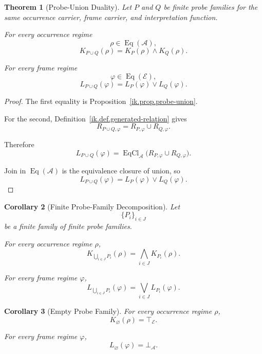 \documentclass[11pt]{article}
\theoremstyle{plain}
\newtheorem{theorem}{Theorem}[section]
\newtheorem{corollary}[theorem]{Corollary}
\theoremstyle{definition}
\theoremstyle{remark}
\begin{document}
\begin{theorem}[Probe-Union Duality]
  \label{ik.thm.probe-union-duality}
  Let \(P\) and \(Q\)
  be finite probe families
  for the same occurrence carrier,
  frame carrier,
  and interpretation function.

  For every occurrence regime
  \[
    \rho
    \in
    \operatorname{Eq}(\mathcal{A}),
  \]
  \[
    K_{P\cup Q}(\rho)
    =
    K_P(\rho)
    \wedge
    K_Q(\rho).
  \]

  For every frame regime
  \[
    \varphi
    \in
    \operatorname{Eq}(\mathcal{E}),
  \]
  \[
    L_{P\cup Q}(\varphi)
    =
    L_P(\varphi)
    \vee
    L_Q(\varphi).
  \]
\end{theorem}

\begin{proof}
  The first equality is
  Proposition~\ref{ik.prop.probe-union}.

  For the second,
  Definition~\ref{ik.def.generated-relation}
  gives
  \[
    R_{P\cup Q,\varphi}
    =
    R_{P,\varphi}
    \cup
    R_{Q,\varphi}.
  \]

  Therefore
  \[
    L_{P\cup Q}(\varphi)
    =
    \operatorname{EqCl}_{\mathcal{A}}
    \bigl(
    R_{P,\varphi}
    \cup
    R_{Q,\varphi}
    \bigr).
  \]

  Join in
  \(\operatorname{Eq}(\mathcal{A})\)
  is the equivalence closure of union,
  so
  \[
    L_{P\cup Q}(\varphi)
    =
    L_P(\varphi)
    \vee
    L_Q(\varphi).
  \]
\end{proof}

\begin{corollary}[Finite Probe-Family Decomposition]
  \label{ik.cor.probe-decomposition}
  Let
  \[
    \{
    P_i
    \}_{i\in J}
  \]
  be a finite family of finite probe families.

  For every occurrence regime \(\rho\),
  \[
    K_{\bigcup_{i\in J}P_i}(\rho)
    =
    \bigwedge_{i\in J}
    K_{P_i}(\rho).
  \]

  For every frame regime \(\varphi\),
  \[
    L_{\bigcup_{i\in J}P_i}(\varphi)
    =
    \bigvee_{i\in J}
    L_{P_i}(\varphi).
  \]
\end{corollary}

\begin{corollary}[Empty Probe Family]
  \label{ik.cor.empty-probe-adjoint}
  For every occurrence regime \(\rho\),
  \[
    K_{\varnothing}(\rho)
    =
    \top_{\mathcal{E}}.
  \]

  For every frame regime \(\varphi\),
  \[
    L_{\varnothing}(\varphi)
    =
    \bot_{\mathcal{A}}.
  \]
\end{corollary}
\end{document}

